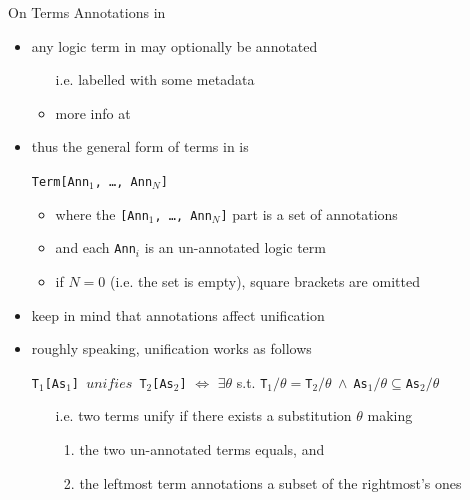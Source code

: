 \documentclass[presentation]{beamer}\mode<presentation>{\usetheme{AMSBolognaFC}}
\begin{document}
\begin{frame}[c]{On Terms Annotations in \jason{}}

\begin{itemize}
    \item any logic term in \jason{} may optionally be \alert{annotated}
    \begin{itemize}
        \item[i.e.] labelled with some metadata
        \item more info at 
    \end{itemize}

    \vfill

    \item thus the general form of terms in \jason{} is
    \begin{center}
        \texttt{Term\alert{[Ann$_1$, \ldots, Ann$_N$]}}
    \end{center}
    \begin{itemize}
        \item where the \texttt{[Ann$_1$, \ldots, Ann$_N$]} part is a \alert{set} of annotations
        \item and each \texttt{Ann$_i$} is an un-annotated logic term
        \item if $N = 0$ (i.e. the set is empty), square brackets are omitted
    \end{itemize}

    \vfill

    \item keep in mind that \alert{annotations affect unification}
    
    \vfill
    
    \item roughly speaking, unification works as follows
    \begin{center}
        \texttt{T$_1$[As$_1$] $unifies$ T$_2$[As$_2$]} $\Leftrightarrow$ $\exists \theta$ s.t. \texttt{T$_1 / \theta = $T$_2 / \theta\ \wedge\ $As$_1 / \theta \subseteq $As$_2 / \theta $}
    \end{center}
    \begin{itemize}
        \item[i.e.] two terms unify if there exists a substitution $\theta$ making
        \begin{enumerate}
            \item the two un-annotated terms equals, and 
            \item the leftmost term annotations a subset of the rightmost's ones
        \end{enumerate}
    \end{itemize}
\end{itemize}

\end{frame} 
\end{document}
